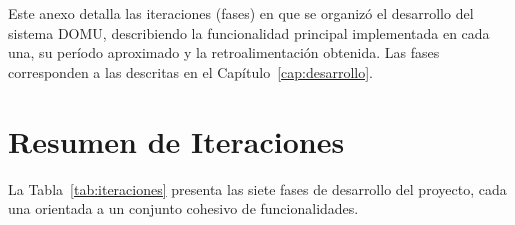 
Este anexo detalla las iteraciones (fases) en que se organizó el desarrollo del sistema DOMU, describiendo la funcionalidad principal implementada en cada una, su período aproximado y la retroalimentación obtenida. Las fases corresponden a las descritas en el Capítulo~\ref{cap:desarrollo}.

\section{Resumen de Iteraciones}

La Tabla~\ref{tab:iteraciones} presenta las siete fases de desarrollo del proyecto, cada una orientada a un conjunto cohesivo de funcionalidades.

